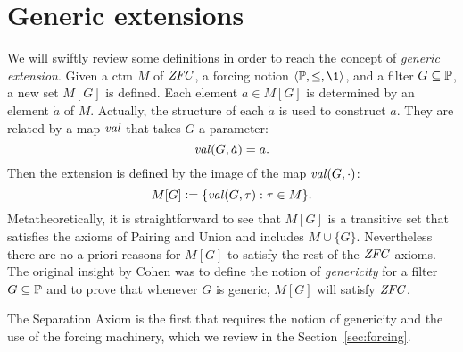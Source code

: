 \section{Generic extensions}

We will swiftly review some definitions in order to reach the concept
of \emph{generic extension}. Given a ctm $M$ of $\mathit{ZFC}$, a forcing
notion $\lb\PP,\leq,\1\rb$, and a filter
$G\subseteq\mathbb{P}$, a new set $M[G]$ is defined. Each element $a\in M[G]$ is
determined by an element $\dot a$ of $M$. Actually, the structure of
each $\dot a$ is used to construct $a$. They are related by a
map $\operatorname{\mathit{val}}$ that takes $G$ a parameter:
\[
\operatorname{\mathit{val}}(G,\dot a) = a.
\] 
Then the extension is defined by the image of the map $\operatorname{\mathit{val}}(G,\cdot)$:
\[
M[G] \mathrel{\mathop:}= \{\operatorname{\mathit{val}}(G,\tau): \tau\in M\}.
\]
Metatheoretically, it is straightforward to see that $M[G]$ is a
transitive set that satisfies the axioms of Pairing and Union and
includes $M\cup\{G\}$. Nevertheless there are no a priori reasons for
$M[G]$ to satisfy the rest of the $\mathit{ZFC}$ 
axioms. The original insight by Cohen was to define the notion of
\emph{genericity} for a filter $G\subseteq\mathbb{P}$ and to prove that whenever
$G$ is generic, $M[G]$ will satisfy $\mathit{ZFC}$.

The Separation Axiom  is the first that requires the notion of
genericity and the use of the forcing machinery, which we review in
the Section~\ref{sec:forcing}.

